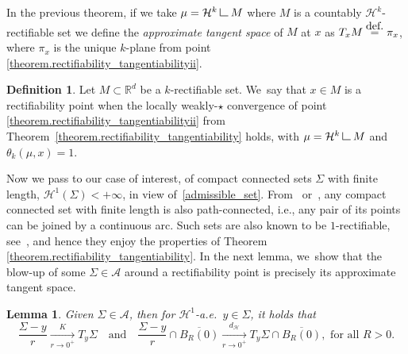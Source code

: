 \documentclass[11pt]{article}
\newcommand{\ie}{i.e.,\xspace}
\numberwithin{equation}{section}
\let\ts\textstyle
\newtheorem{lemma}[theorem]{Lemma}
\theoremstyle{definition}
\newtheorem{definition}[theorem]{Definition}
\newcommand{\eqdef}{\ensuremath{\stackrel{\mbox{\upshape\tiny def.}}{=}}}
\newcommand\LM[1]{\hbox{\vrule width.5pt \vbox to#1pt{\vfill \hrule width#1pt height.5pt}}}
\newcommand\LL{{\mathchoice {\>\LM7\>}{\>\LM7\>}{\,\LM5\,}{\,\LM{3.35}\,}}}
\newcommand{\mres}{\LL}
\newcommand\cH{\mathcal{H}}
\newcommand{\RR}{\mathbb{R}}
\newcommand{\distH}{d_{\mathcal{H}}}
\begin{document}
In the previous theorem, if we take $\mu = \cH^k\mres M$ where $M$ is a countably $\cH^k$\nobreakdash-rectifiable set we define the \emph{approximate tangent space} of $M$ at $x$ as $T_x M \eqdef \pi_x$, where $\pi_x$ is the unique $k$-plane from point \eqref{theorem.rectifiability_tangentiabilityii}.

\begin{definition}\label{definiton.rectifiability_point}
Let $M\subset \RR^d$ be a $k$-rectifiable set. We~say that $x \in M$ is a rectifiability point when the locally weakly-$\star$ convergence of point \eqref{theorem.rectifiability_tangentiabilityii} from Theorem~\ref{theorem.rectifiability_tangentiability} holds, with $\mu = \cH^k\mres M$ and $\theta_k(\mu,x)=1$.
\end{definition}

Now we pass to our case of interest, of compact connected sets $\Sigma$ with finite length, $\mathcal{H}^1(\Sigma) < +\infty$, in view of~\eqref{admissible_set}. From~\cite[Prop.\,30.1 \& Cor.\,30.2]{david2006singular} or~\cite[Th.\,4.4]{alberti2017structure}, any compact connected set with finite length is also path-connected, \ie any pair of its points can be joined by a continuous arc. Such sets are also known to be $1$-rectifiable, see~\cite[Th.\,4.4.8]{ambrosio2004topics}, and hence they enjoy the properties of Theorem \ref{theorem.rectifiability_tangentiability}. In the next lemma, we~show that the blow-up of some $\Sigma \in \mathcal{A}$ around a rectifiability point is precisely its approximate tangent space.

\begin{lemma}\label{lemma.blowup_domain_measure}
Given $\Sigma \in \mathcal{A}$, then for $\cH^1$-a.e.\ $y \in \Sigma$, it holds that
\[
\frac{\Sigma - y}{r} \xrightarrow[r \to 0^+]{\ts K} T_y\Sigma
\quad \text{and} \quad
\frac{\Sigma - y}{r}\cap \overline{B_R(0)} \xrightarrow[r \to 0^+]{\ts\distH} T_y\Sigma\cap \overline{B_R(0)}, \text{ for all $R>0$.}
\]
\end{lemma}
\end{document}

